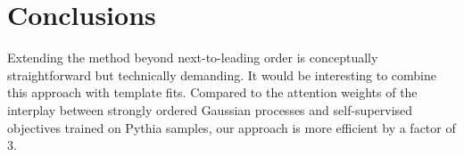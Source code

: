 \section{Conclusions}\label{sec:conclusions}

Extending the method beyond next-to-leading order is conceptually
straightforward but technically demanding. It would be interesting to
combine this approach with template fits. Compared to the attention
weights of the interplay between strongly ordered Gaussian processes and
self-supervised objectives trained on Pythia samples, our approach is
more efficient by a factor of 3.

